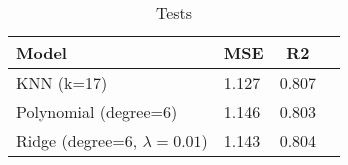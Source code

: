 \begin{table}
\centering
\caption{Tests}
\label{tab:tests}
\begin{tabular}{|l|l|c|c|}
\toprule
                           Model &   MSE &    R2 \\
\midrule
                      KNN (k=17) & 1.127 & 0.807 \\
           Polynomial (degree=6) & 1.146 & 0.803 \\
Ridge (degree=6, $\lambda=0.01$) & 1.143 & 0.804 \\
\bottomrule
\end{tabular}
\end{table}
